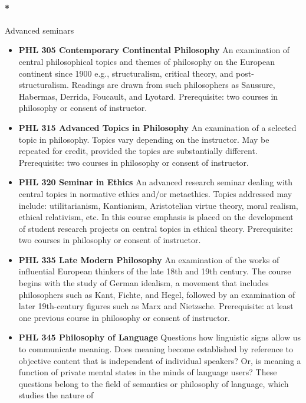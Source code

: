 \documentclass[
  letterpaper,
]{scrbook}
\providecommand{\tightlist}{%
  \setlength{\itemsep}{0pt}\setlength{\parskip}{0pt}}
\let\oldparagraph\paragraph
\renewcommand{\paragraph}[1]{\oldparagraph{#1}\mbox{}}
\begin{document}
\hypertarget{advanced-seminars}{%
\paragraph*{Advanced seminars}\label{advanced-seminars}}

\begin{itemize}
\tightlist
\item
  \textbf{PHL 305 Contemporary Continental Philosophy} An examination of
  central philosophical topics and themes of philosophy on the European
  continent since 1900 e.g., structuralism, critical theory, and
  post-structuralism. Readings are drawn from such philosophers as
  Saussure, Habermas, Derrida, Foucault, and Lyotard. Prerequisite: two
  courses in philosophy or consent of instructor.
\item
  \textbf{PHL 315 Advanced Topics in Philosophy} An examination of a
  selected topic in philosophy. Topics vary depending on the instructor.
  May be repeated for credit, provided the topics are substantially
  different. Prerequisite: two courses in philosophy or consent of
  instructor.
\item
  \textbf{PHL 320 Seminar in Ethics} An advanced research seminar
  dealing with central topics in normative ethics and/or metaethics.
  Topics addressed may include: utilitarianism, Kantianism, Aristotelian
  virtue theory, moral realism, ethical relativism, etc. In this course
  emphasis is placed on the development of student research projects on
  central topics in ethical theory. Prerequisite: two courses in
  philosophy or consent of instructor.
\item
  \textbf{PHL 335 Late Modern Philosophy} An examination of the works of
  influential European thinkers of the late 18th and 19th century. The
  course begins with the study of German idealism, a movement that
  includes philosophers such as Kant, Fichte, and Hegel, followed by an
  examination of later 19th-century figures such as Marx and Nietzsche.
  Prerequisite: at least one previous course in philosophy or consent of
  instructor.
\item
  \textbf{PHL 345 Philosophy of Language} Questions how linguistic signs
  allow us to communicate meaning. Does meaning become established by
  reference to objective content that is independent of individual
  speakers? Or, is meaning a function of private mental states in the
  minds of language users? These questions belong to the field of
  semantics or philosophy of language, which studies the nature of

\end{itemize}
\end{document}
